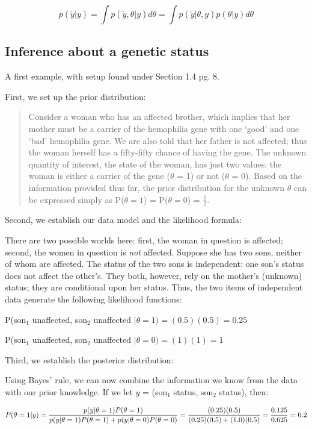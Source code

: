 \documentclass[]{book}
\begin{document}
\[
p(\tilde{y}|y) = \int p(\tilde{y},\theta|y)d\theta = \int p(\tilde{y}|\theta,y)p(\theta|y)d\theta
\]

\subsection{Inference about a genetic
status}\label{inference-about-a-genetic-status}

A first example, with setup found under Section 1.4 pg. 8.

First, we set up the prior distribution:

\begin{quote}
Consider a woman who has an affected brother, which implies that her
mother must be a carrier of the hemophilia gene with one `good' and one
`bad' hemophilia gene. We are also told that her father is not affected;
thus the woman herself has a fifty-fifty chance of having the gene. The
unknown quantity of interest, the state of the woman, has just two
values: the woman is either a carrier of the gene (\(\theta\) = 1) or
not (\(\theta\) = 0). Based on the information provided thus far, the
prior distribution for the unknown \(\theta\) can be expressed simply as
P(\(\theta = 1\)) = P(\(\theta = 0\)) = \(\frac{1}{2}\).
\end{quote}

Second, we establish our data model and the likelihood formula:

There are two possible worlds here: first, the woman in question is
affected; second, the women in question is \emph{not} affected. Suppose
she has two sons, neither of whom are affected. The status of the two
sons is independent: one son's status does not affect the other's. They
both, however, rely on the mother's (unknown) status; they are
conditional upon her status. Thus, the two items of independent data
generate the following likelihood functions:

P(son\(_1\) unaffected, son\(_2\) unaffected
\(| \theta = 1) = (0.5)(0.5) = 0.25\)

P(son\(_1\) unaffected, son\(_2\) unaffected
\(| \theta = 0) = (1)(1) = 1\)

Third, we establish the posterior distribution:

Using Bayes' rule, we can now combine the information we know from the
data with our prior knowledge. If we let \(y\) = (son\(_1\) status,
son\(_2\) status), then:

\[
P(\theta = 1|y) = \frac{p(y|\theta = 1)P(\theta = 1)}{p(y|\theta = 1)P(\theta = 1) + p(y|\theta = 0)P(\theta = 0)}\\
= \frac{(0.25)(0.5)}{(0.25)(0.5) + (1.0)(0.5)} = \frac{0.125}{0.625} = 0.2
\]
\end{document}
